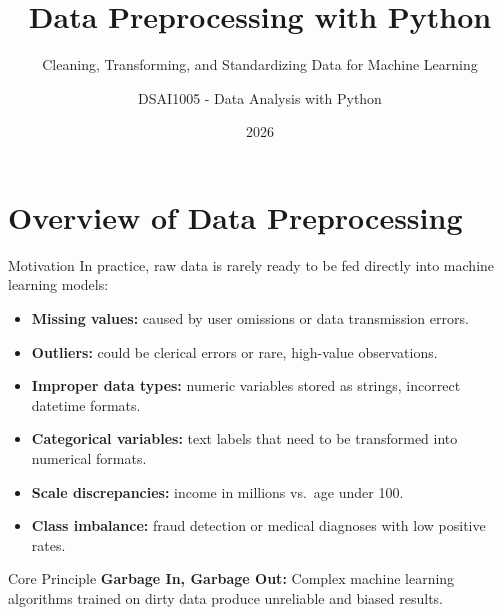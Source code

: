 \documentclass[aspectratio=169,11pt]{beamer}
\title[Data Preprocessing with Python]{Data Preprocessing with Python}
\subtitle{Cleaning, Transforming, and Standardizing Data for Machine Learning}
\author{DSAI1005 - Data Analysis with Python}
\institute{Department of Data Science and Artificial Intelligence\\National Economics University}
\date{2026}
\newcommand{\smallgap}{\vspace{0.35em}}
\begin{document}
\begin{frame}
  \titlepage
\end{frame}

\section{Overview of Data Preprocessing}

\begin{frame}{Motivation}
In practice, raw data is rarely ready to be fed directly into machine learning models:
\begin{itemize}
  \item \textbf{Missing values:} caused by user omissions or data transmission errors.
  \item \textbf{Outliers:} could be clerical errors or rare, high-value observations.
  \item \textbf{Improper data types:} numeric variables stored as strings, incorrect datetime formats.
  \item \textbf{Categorical variables:} text labels that need to be transformed into numerical formats.
  \item \textbf{Scale discrepancies:} income in millions vs.\ age under 100.
  \item \textbf{Class imbalance:} fraud detection or medical diagnoses with low positive rates.
\end{itemize}

\smallgap
\begin{alertblock}{Core Principle}
\textbf{Garbage In, Garbage Out:} Complex machine learning algorithms trained on dirty data produce unreliable and biased results.
\end{alertblock}
\end{frame}
\end{document}
